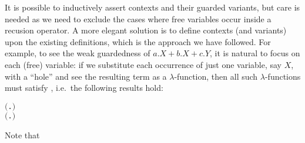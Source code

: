 It is possible to inductively assert \multivariate contexts and their
guarded variants, but care is needed as  we need to exclude the cases where
free variables occur inside a recusion operator. A more elegant
 solution is to define \multivariate contexts (and variants) upon the
existing \univariate definitions, which is the approach we have followed.
For example, to see the weak guardedness of $a.X + b.X + c.Y$, it is
natural to focus on each (free) variable: if we substitute each
occurrence of just one variable, say $X$, with a ``hole'' and see the
resulting term as a $\lambda$-function, then all such $\lambda$-functions
must satisfy , i.e.~the following results hold:
\begin{alltt}
\HOLTokenTurnstile{}  \ensuremath{(}\HOLTokenLambda{}. \HOLSymConst{\ensuremath{\ldotp}} \HOLSymConst{\ensuremath{+}} \HOLSymConst{\ensuremath{\ldotp}} \HOLSymConst{\ensuremath{+}} \HOLSymConst{\ensuremath{\ldotp}} \ensuremath{)}
\HOLTokenTurnstile{}  \ensuremath{(}\HOLTokenLambda{}. \HOLSymConst{\ensuremath{\ldotp}}  \HOLSymConst{\ensuremath{+}} \HOLSymConst{\ensuremath{\ldotp}}  \HOLSymConst{\ensuremath{+}} \HOLSymConst{\ensuremath{\ldotp}}\ensuremath{)}
\end{alltt}
Note that 
